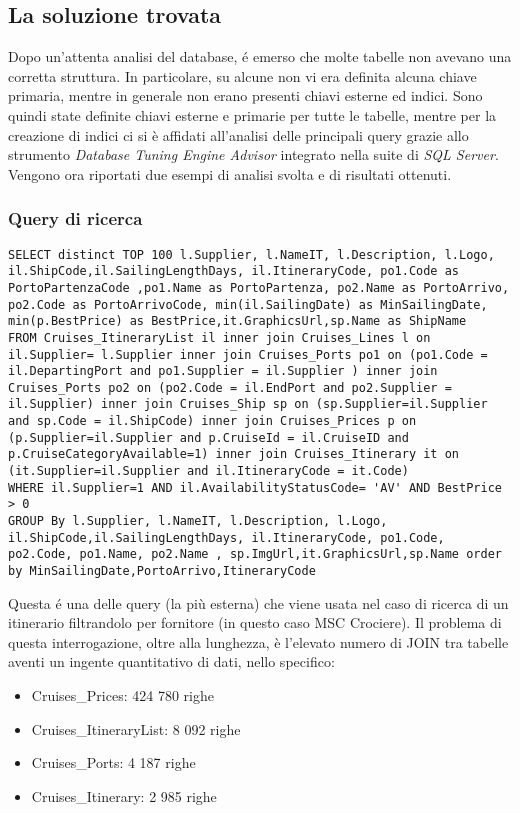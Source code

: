 \subsection{La soluzione trovata}
Dopo un'attenta analisi del database, é emerso che molte tabelle non avevano una corretta struttura. In particolare, su alcune non vi era definita alcuna chiave primaria, mentre in generale non erano presenti chiavi esterne ed indici. Sono quindi state definite chiavi esterne e primarie per tutte le tabelle, mentre per la creazione di indici ci si è affidati all'analisi delle principali query grazie allo strumento \textit{Database Tuning Engine Advisor} integrato nella suite di \textit{SQL Server}. Vengono ora riportati due esempi di analisi svolta e di risultati ottenuti.
\subsubsection{Query di ricerca}

\begin{lstlisting}
SELECT distinct TOP 100 l.Supplier, l.NameIT, l.Description, l.Logo, il.ShipCode,il.SailingLengthDays, il.ItineraryCode, po1.Code as PortoPartenzaCode ,po1.Name as PortoPartenza, po2.Name as PortoArrivo, po2.Code as PortoArrivoCode, min(il.SailingDate) as MinSailingDate, min(p.BestPrice) as BestPrice,it.GraphicsUrl,sp.Name as ShipName 
FROM Cruises_ItineraryList il inner join Cruises_Lines l on il.Supplier= l.Supplier inner join Cruises_Ports po1 on (po1.Code = il.DepartingPort and po1.Supplier = il.Supplier ) inner join Cruises_Ports po2 on (po2.Code = il.EndPort and po2.Supplier = il.Supplier) inner join Cruises_Ship sp on (sp.Supplier=il.Supplier and sp.Code = il.ShipCode) inner join Cruises_Prices p on (p.Supplier=il.Supplier and p.CruiseId = il.CruiseID and p.CruiseCategoryAvailable=1) inner join Cruises_Itinerary it on (it.Supplier=il.Supplier and il.ItineraryCode = it.Code) 
WHERE il.Supplier=1 AND il.AvailabilityStatusCode= 'AV' AND BestPrice > 0 
GROUP By l.Supplier, l.NameIT, l.Description, l.Logo, il.ShipCode,il.SailingLengthDays, il.ItineraryCode, po1.Code, po2.Code, po1.Name, po2.Name , sp.ImgUrl,it.GraphicsUrl,sp.Name order by MinSailingDate,PortoArrivo,ItineraryCode
\end{lstlisting}
Questa é una delle query (la più esterna) che viene usata nel caso di ricerca di un itinerario filtrandolo per fornitore (in questo caso MSC Crociere). Il problema di questa interrogazione, oltre alla lunghezza, è l'elevato numero di JOIN tra tabelle aventi un ingente quantitativo di dati, nello specifico:
\begin{itemize}
	\item Cruises\_Prices: 424 780 righe
	\item Cruises\_ItineraryList: 8 092 righe
	\item Cruises\_Ports: 4 187 righe
	\item Cruises\_Itinerary: 2 985 righe
\end{itemize}

